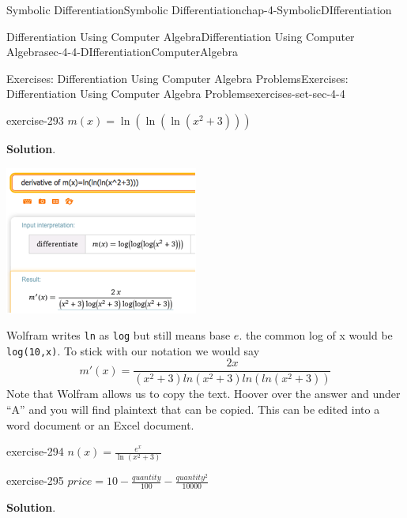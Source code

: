 \documentclass[oneside,10pt,]{book}
\newcommand{\mono}[1]{\texttt{#1}}
\numberwithin{equation}{section}
\begin{document}
\begin{chapterptx}{Symbolic Differentiation}{}{Symbolic Differentiation}{}{}{chap-4-SymbolicDIfferentiation}
\begin{sectionptx}{Differentiation Using Computer Algebra}{}{Differentiation Using Computer Algebra}{}{}{sec-4-4-DIfferentiationComputerAlgebra}
\begin{exercises-subsection-numberless}{Exercises: Differentiation Using Computer Algebra Problems}{}{Exercises: Differentiation Using Computer Algebra Problems}{}{}{exercises-set-sec-4-4}
\begin{divisionexercise}{5}{}{}{exercise-293}
\hypertarget{p-1748}{}%
\(m(x)=\ln(\ln(\ln(x^2+3)))\)%
\par\smallskip%
\noindent\textbf{Solution}.\hypertarget{solution-146}{}\quad%
\leavevmode%
\begin{sidebyside}{1}{0.25}{0.25}{0}%
\begin{sbspanel}{0.5}%
\includegraphics[width=1\linewidth]{images/sec4-4-sol5a.png}
\end{sbspanel}%
\end{sidebyside}%
\par
\hypertarget{p-1749}{}%
Wolfram writes \mono{ln} as \mono{log} but still means base \(e\).  the common log of x would be \mono{log(10,x)}. To stick with our notation we would say%
%
\begin{equation*}
m'(x)=\frac{2 x}{(x^2+3)ln(x^2+3)ln(ln(x^2+3))} 
\end{equation*}
\hypertarget{p-1750}{}%
Note that Wolfram allows us to copy the text. Hoover over the answer and under “A”  and you will find plaintext that can be copied. This can be edited into a word document or an Excel document.%
\end{divisionexercise}%
\begin{divisionexercise}{6}{}{}{exercise-294}%
\hypertarget{p-1751}{}%
\(n(x)=\frac{e^x}{\ln(x^2+3)}\)%
\end{divisionexercise}%
\begin{divisionexercise}{7}{}{}{exercise-295}%
\hypertarget{p-1752}{}%
\(price=10-\frac{quantity}{100} -\frac{quantity^2}{10000}\)%
\par\smallskip%
\noindent\textbf{Solution}.\hypertarget{solution-147}{}\quad%

\end{divisionexercise}
\end{exercises-subsection-numberless}
\end{sectionptx}
\end{chapterptx}
\end{document}
